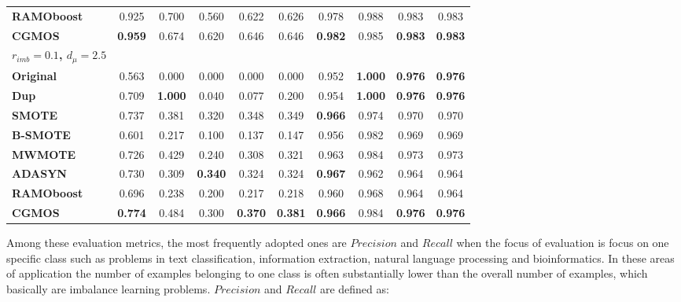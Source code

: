 \documentclass{iitthesis}
\begin{document}
\begin{table}[]
\begin{center}
{\begin{tabular}{lccccccccc}
\multicolumn{1}{l}{\textbf{RAMOboost}} & 0.925 & 0.700 & 0.560 & 0.622 & 0.626 & 0.978 & 0.988 & 0.983 & 0.983 \\
\multicolumn{1}{l}{\textbf{CGMOS}} & \textbf{0.959} & 0.674 & 0.620 & 0.646 & 0.646 & \textbf{0.982} & 0.985 & \textbf{0.983} & \textbf{0.983} \\
\hline
\multicolumn{1}{l}{\textbf{$r_{imb}=0.1$, $d_{\mu}=2.5$}} &  & \multicolumn{4}{c}{} & \multicolumn{4}{c}{} \\
\hline
\multicolumn{1}{l}{\textbf{Original}} & 0.563 & 0.000 & 0.000 & 0.000 & 0.000 & 0.952 & \textbf{1.000} & \textbf{0.976} & \textbf{0.976} \\
\multicolumn{1}{l}{\textbf{Dup}} & 0.709 & \textbf{1.000} & 0.040 & 0.077 & 0.200 & 0.954 & \textbf{1.000} & \textbf{0.976} & \textbf{0.976} \\ 
\multicolumn{1}{l}{\textbf{SMOTE}} & 0.737 & 0.381 & 0.320 & 0.348 & 0.349 & \textbf{0.966} & 0.974 & 0.970 & 0.970 \\
\multicolumn{1}{l}{\textbf{B-SMOTE}} & 0.601 & 0.217 & 0.100 & 0.137 & 0.147 & 0.956 & 0.982 & 0.969 & 0.969 \\
\multicolumn{1}{l}{\textbf{MWMOTE}} & 0.726 & 0.429 & 0.240 & 0.308 & 0.321 & 0.963 & 0.984 & 0.973 & 0.973 \\
\multicolumn{1}{l}{\textbf{ADASYN}} & 0.730 & 0.309 & \textbf{0.340} & 0.324 & 0.324 & \textbf{0.967} & 0.962 & 0.964 & 0.964 \\
\multicolumn{1}{l}{\textbf{RAMOboost}} & 0.696 & 0.238 & 0.200 & 0.217 & 0.218 & 0.960 & 0.968 & 0.964 & 0.964 \\
\multicolumn{1}{l}{\textbf{CGMOS}} & \textbf{0.774} & 0.484 & 0.300 & \textbf{0.370} & \textbf{0.381} & \textbf{0.966} & 0.984 & \textbf{0.976} & \textbf{0.976} \\
\hline
\end{tabular}
}
\end{center}
\label{tab: results_synthetic_data}
\end{table}


Among these evaluation metrics, the most frequently adopted ones are $Precision$ and $Recall$ when the focus of evaluation is focus on one specific class such as problems in text classification, information extraction, natural language processing and bioinformatics. In these areas of application the number of examples belonging to one class is often substantially lower than the overall number of examples, which basically are imbalance learning problems. $Precision$ and $Recall$ are defined as:
\end{document}
